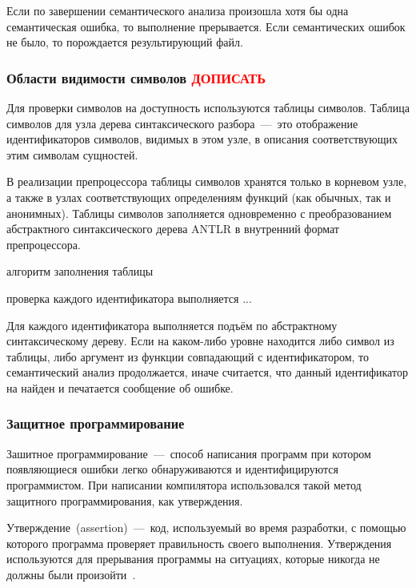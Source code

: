 \documentclass[12pt,a4paper,oneside]{extarticle}
\begin{document}
            Если по завершении семантического анализа произошла хотя бы одна семантическая ошибка, то выполнение прерывается. Если семантических ошибок не было, то порождается результирующий файл.

        \subsubsection{Области видимости символов \textcolor{red}{ДОПИСАТЬ}}
            Для проверки символов на доступность используются таблицы символов.
            Таблица символов для узла дерева синтаксического разбора~---~это отображение идентификаторов символов, видимых в этом узле, в описания соответствующих этим символам сущностей.

            В реализации препроцессора таблицы символов хранятся только в корневом узле, а также в узлах соответствующих определениям функций (как обычных, так и анонимных). Таблицы символов заполняется одновременно с преобразованием абстрактного синтаксического дерева ANTLR в внутренний формат препроцессора. 

            алгоритм заполнения таблицы


            проверка каждого идентификатора выполняется ...

            Для каждого идентификатора выполняется подъём по абстрактному синтаксическому дереву. Если на каком-либо уровне находится либо символ из таблицы, либо аргумент из функции совпадающий с идентификатором, то семантический анализ продолжается, иначе считается, что данный идентификатор на найден и печатается сообщение об ошибке.

        \subsubsection{Защитное программирование}
            Зашитное программирование~---~способ написания программ при котором появляющиеся ошибки легко обнаруживаются и идентифицируются программистом.
            При написании компилятора использовался такой метод защитного программирования, как утверждения.

            Утверждение~(assertion)~---~код, используемый во время разработки, с помощью которого программа проверяет правильность своего выполнения. Утверждения используются для прерывания программы на ситуациях, которые никогда не должны были произойти~\cite{mcconnell}.
\end{document}
